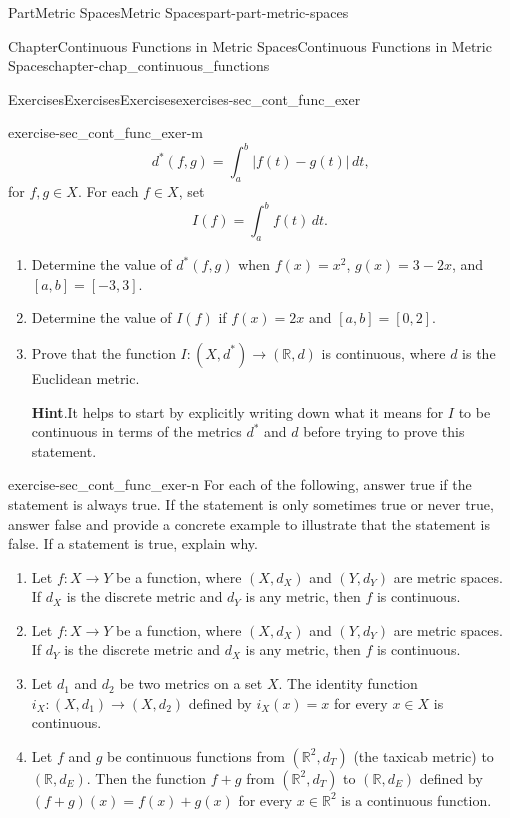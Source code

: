 \documentclass[oneside,10pt,]{book}
\newcommand{\blocktitlefont}{\relax}
\numberwithin{equation}{chapter}
\newcommand{\R}{\mathbb{R}}
\newcommand{\la}{\left|}
\newcommand{\ra}{\right|}
\begin{document}
\begin{partptx}{Part}{Metric Spaces}{}{Metric Spaces}{}{}{part-part-metric-spaces}
\begin{chapterptx}{Chapter}{Continuous Functions in Metric Spaces}{}{Continuous Functions in Metric Spaces}{}{}{chapter-chap_continuous_functions}
\begin{exercises-section}{Exercises}{Exercises}{}{Exercises}{}{}{exercises-sec_cont_func_exer}
\begin{divisionexercise}{13}{}{}{exercise-sec_cont_func_exer-m}
\begin{equation*}
d^*(f,g)= \int_a^b \la f(t)-g(t) \ra \, dt\text{,}
\end{equation*}
for \(f, g \in X\). For each \(f \in X\), set%
\begin{equation*}
I(f) = \int_a^b f(t) \, dt\text{.}
\end{equation*}
%
\begin{enumerate}[font=\bfseries,label=(\alph*),ref=\alph*]%
\item{}Determine the value of \(d^*(f,g)\) when \(f(x) = x^2\), \(g(x) = 3-2x\), and \([a,b] = [-3,3]\).%
\item{}Determine the value of \(I(f)\) if \(f(x) = 2x\) and \([a,b] = [0,2]\).%
\item{}Prove that the function \(I : (X, d^*) \to (\R,d)\) is continuous, where \(d\) is the Euclidean metric.%
\par\smallskip%
\noindent\textbf{\blocktitlefont Hint}.\hypertarget{hint-sec_cont_func_exer-m-d-b}{}\quad{}It helps to start by explicitly writing down what it means for \(I\) to be continuous in terms of the metrics \(d^*\) and \(d\) before trying to prove this statement.%
\end{enumerate}%
\end{divisionexercise}%
\begin{divisionexercise}{14}{}{}{exercise-sec_cont_func_exer-n}%
For each of the following, answer true if the statement is always true. If the statement is only sometimes true or never true, answer false and provide a concrete example to illustrate that the statement is false. If a statement is true, explain why.%
\begin{enumerate}[font=\bfseries,label=(\alph*),ref=\alph*]%
\item{}Let \(f : X \to Y\) be a function, where \((X, d_X)\) and \((Y, d_Y)\) are metric spaces. If \(d_X\) is the discrete metric and \(d_Y\) is any metric, then \(f\) is continuous.%
\item{}Let \(f : X \to Y\) be a function, where \((X, d_X)\) and \((Y, d_Y)\) are metric spaces. If \(d_Y\) is the discrete metric and \(d_X\) is any metric, then \(f\) is continuous.%
\item{}Let \(d_1\) and \(d_2\) be two metrics on a set \(X\). The identity function \(i_X : (X,d_1) \to (X,d_2)\) defined by \(i_X(x) = x\) for every \(x \in X\) is continuous.%
\item{}Let \(f\) and \(g\) be continuous functions from \((\R^2, d_T)\) (the taxicab metric) to \((\R,d_E)\). Then the function \(f+g\) from \((\R^2, d_T)\) to \((\R,d_E)\) defined by \((f+g)(x) = f(x) + g(x)\) for every \(x \in \R^2\) is a continuous function.%

\end{enumerate}
\end{divisionexercise}
\end{exercises-section}
\end{chapterptx}
\end{partptx}
\end{document}
